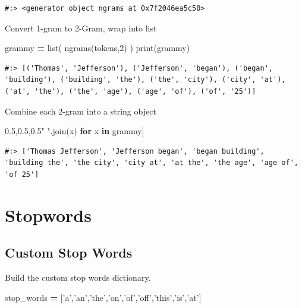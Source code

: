 \documentclass[
]{book}
\newenvironment{Shaded}{\begin{snugshade}}{\end{snugshade}}
\newcommand{\BuiltInTok}[1]{#1}
\newcommand{\ControlFlowTok}[1]{\textcolor[rgb]{0.27,0.27,0.27}{\textbf{#1}}}
\newcommand{\DecValTok}[1]{\textcolor[rgb]{0.06,0.06,0.06}{#1}}
\newcommand{\KeywordTok}[1]{\textcolor[rgb]{0.27,0.27,0.27}{\textbf{#1}}}
\newcommand{\NormalTok}[1]{#1}
\newcommand{\OperatorTok}[1]{\textcolor[rgb]{0.43,0.43,0.43}{\textbf{#1}}}
\newcommand{\StringTok}[1]{\textcolor[rgb]{0.5,0.5,0.5}{#1}}
\begin{document}
\begin{verbatim}
#:> <generator object ngrams at 0x7f2046ea5c50>
\end{verbatim}

Convert 1-gram to 2-Gram, wrap into list

\begin{Shaded}
\begin{Highlighting}[]
\NormalTok{grammy }\OperatorTok{=} \BuiltInTok{list}\NormalTok{( ngrams(tokens,}\DecValTok{2}\NormalTok{) )}
\BuiltInTok{print}\NormalTok{(grammy)}
\end{Highlighting}
\end{Shaded}

\begin{verbatim}
#:> [('Thomas', 'Jefferson'), ('Jefferson', 'began'), ('began', 'building'), ('building', 'the'), ('the', 'city'), ('city', 'at'), ('at', 'the'), ('the', 'age'), ('age', 'of'), ('of', '25')]
\end{verbatim}

Combine each 2-gram into a string object

\begin{Shaded}
\begin{Highlighting}[]
\NormalTok{[ }\StringTok{" "}\NormalTok{.join(x) }\ControlFlowTok{for}\NormalTok{ x }\KeywordTok{in}\NormalTok{ grammy]}
\end{Highlighting}
\end{Shaded}

\begin{verbatim}
#:> ['Thomas Jefferson', 'Jefferson began', 'began building', 'building the', 'the city', 'city at', 'at the', 'the age', 'age of', 'of 25']
\end{verbatim}

\hypertarget{stopwords}{%
\section{Stopwords}\label{stopwords}}

\hypertarget{custom-stop-words}{%
\subsection{Custom Stop Words}\label{custom-stop-words}}

Build the custom stop words dictionary.

\begin{Shaded}
\begin{Highlighting}[]
\NormalTok{stop_words }\OperatorTok{=}\NormalTok{ [}\StringTok{'a'}\NormalTok{,}\StringTok{'an'}\NormalTok{,}\StringTok{'the'}\NormalTok{,}\StringTok{'on'}\NormalTok{,}\StringTok{'of'}\NormalTok{,}\StringTok{'off'}\NormalTok{,}\StringTok{'this'}\NormalTok{,}\StringTok{'is'}\NormalTok{,}\StringTok{'at'}\NormalTok{]}
\end{Highlighting}
\end{Shaded}
\end{document}
